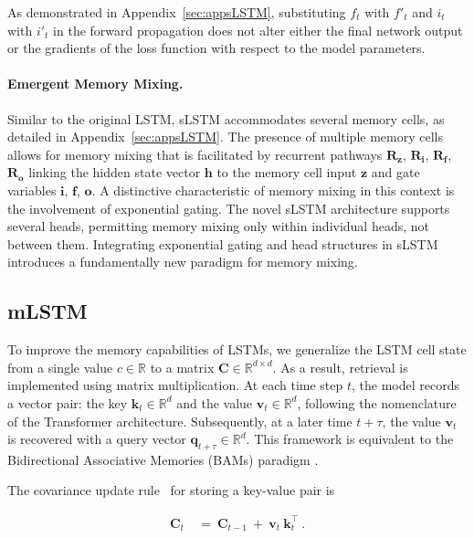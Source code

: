 As demonstrated in Appendix~\ref{sec:appsLSTM}, substituting $f_t$ with $f'_t$ and $i_t$ with $i'_t$ in the forward propagation does not alter either the final network output or the gradients of the loss function with respect to the model parameters.

\paragraph{Emergent Memory Mixing.} Similar to the original LSTM, sLSTM accommodates several memory cells, as detailed in Appendix~\ref{sec:appsLSTM}. The presence of multiple memory cells allows for memory mixing that is facilitated by recurrent pathways $\mathbf{R}_{\mathbf{z}}$, $\mathbf{R}_{\mathbf{i}}$, $\mathbf{R}_{\mathbf{f}}$, $\mathbf{R}_{\mathbf{o}}$ linking the hidden state vector $\mathbf{h}$ to the memory cell input $\mathbf{z}$ and gate variables $\mathbf{i}$, $\mathbf{f}$, $\mathbf{o}$. A distinctive characteristic of memory mixing in this context is the involvement of exponential gating. The novel sLSTM architecture supports several heads, permitting memory mixing only within individual heads, not between them. Integrating exponential gating and head structures in sLSTM introduces a fundamentally new paradigm for memory mixing.

\subsection{mLSTM}
\label{sec:mLSTM}

To improve the memory capabilities of LSTMs, we generalize the LSTM cell state from a single value $c \in \mathbb{R}$ to a matrix $\mathbf{C} \in \mathbb{R}^{d \times d}$. As a result, retrieval is implemented using matrix multiplication. At each time step $t$, the model records a vector pair: the key $\mathbf{k}_t \in \mathbb{R}^d$ and the value $\mathbf{v}_t \in \mathbb{R}^d$, following the nomenclature of the Transformer architecture. Subsequently, at a later time $t + \tau$, the value $\mathbf{v}_t$ is recovered with a query vector $\mathbf{q}_{t+\tau} \in \mathbb{R}^d$. This framework is equivalent to the Bidirectional Associative Memories (BAMs) paradigm \citep{Kohonen:72,Anderson:72,Nakano:72,Anderson:77}.

The covariance update rule~\citep{Sejnowski:77,Dayan:91} for storing a key-value pair is

\begin{align}
\mathbf{C}_t \ &= \ \mathbf{C}_{t-1} \ + \ \mathbf{v}_{t} \ \mathbf{k}_t^\top \ .
\end{align}

